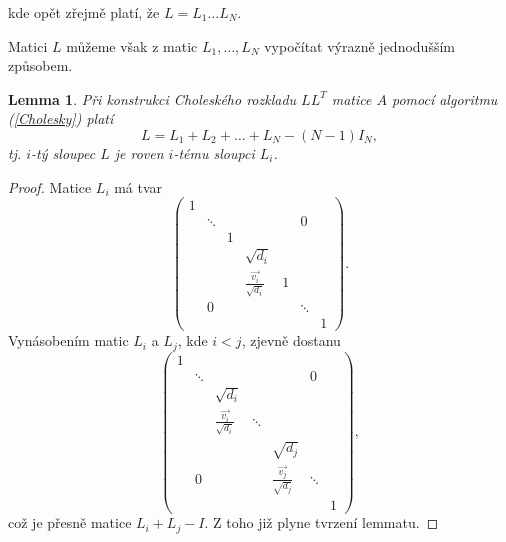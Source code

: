 \documentclass{ctuthesis}
\theoremstyle{plain}
\newtheorem{lemma}{Lemma}
\theoremstyle{definition}
\begin{document}
kde opět zřejmě platí, že $L=L_1...L_N$.

\medskip

Matici $L$ můžeme však z matic $L_1,\ldots,L_N$ vypočítat výrazně jednodušším způsobem.

\begin{lemma}
\label{Lsoucet}
    Při konstrukci Choleského rozkladu $LL^T$ matice $A$ pomocí algoritmu (\ref{Cholesky}) platí
    \begin{equation}
      L = L_1 + L_2 + \ldots + L_N - (N-1)I_N,
    \end{equation}
    tj. $i$-tý sloupec $L$ je roven $i$-tému sloupci $L_i$.
\end{lemma}
\begin{proof}
  Matice $L_i$ má tvar
  \[
  \left(
  \begin{matrix}
    1 &        &   &                              &   &        &   \\
      & \ddots &   &                              &   & 0      &   \\
      &        & 1 &                              &   &        &   \\
      &        &   & \sqrt{d_i}                   &   &        &   \\
      &        &   & \frac{\vec{v_i}}{\sqrt{d_i}} & 1 &        &   \\
      & 0      &   &                              &   & \ddots &   \\
      &        &   &                              &   &        & 1
  \end{matrix}
  \right).
  \]
  Vynásobením matic $L_i$ a $L_j$, kde $i < j$, zjevně dostanu
  \[
  \left(
  \begin{matrix}
    1 &        &   &                              &   &        &   \\
      & \ddots &   &                              &   & 0      &   \\
      &        & \sqrt{d_i} &     &   &        &   \\
      &        & \frac{\vec{v_i}}{\sqrt{d_i}}  &     \ddots               &   &        &   \\
      &        &   &  & \sqrt{d_j} &        &   \\
      & 0      &   &  & \frac{\vec{v_j}}{\sqrt{d_j}}  & \ddots &   \\
      &        &   &  &   &        & 1
  \end{matrix}
  \right),
  \]
  což je přesně matice $L_i + L_j - I$.
  Z toho již plyne tvrzení lemmatu.
\end{proof}
\end{document}
